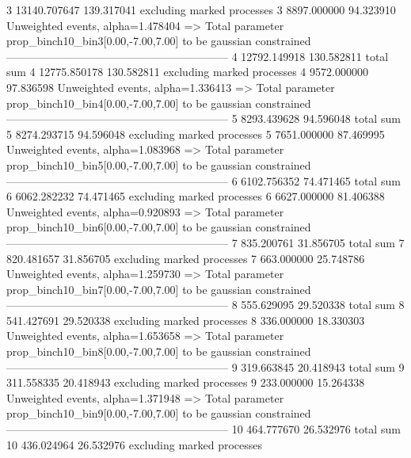 3          13140.707647    139.317041      excluding marked processes    
3          8897.000000     94.323910       Unweighted events, alpha=1.478404
  => Total parameter prop_binch10_bin3[0.00,-7.00,7.00] to be gaussian constrained
------------------------------------------------------------
4          12792.149918    130.582811      total sum                     
4          12775.850178    130.582811      excluding marked processes    
4          9572.000000     97.836598       Unweighted events, alpha=1.336413
  => Total parameter prop_binch10_bin4[0.00,-7.00,7.00] to be gaussian constrained
------------------------------------------------------------
5          8293.439628     94.596048       total sum                     
5          8274.293715     94.596048       excluding marked processes    
5          7651.000000     87.469995       Unweighted events, alpha=1.083968
  => Total parameter prop_binch10_bin5[0.00,-7.00,7.00] to be gaussian constrained
------------------------------------------------------------
6          6102.756352     74.471465       total sum                     
6          6062.282232     74.471465       excluding marked processes    
6          6627.000000     81.406388       Unweighted events, alpha=0.920893
  => Total parameter prop_binch10_bin6[0.00,-7.00,7.00] to be gaussian constrained
------------------------------------------------------------
7          835.200761      31.856705       total sum                     
7          820.481657      31.856705       excluding marked processes    
7          663.000000      25.748786       Unweighted events, alpha=1.259730
  => Total parameter prop_binch10_bin7[0.00,-7.00,7.00] to be gaussian constrained
------------------------------------------------------------
8          555.629095      29.520338       total sum                     
8          541.427691      29.520338       excluding marked processes    
8          336.000000      18.330303       Unweighted events, alpha=1.653658
  => Total parameter prop_binch10_bin8[0.00,-7.00,7.00] to be gaussian constrained
------------------------------------------------------------
9          319.663845      20.418943       total sum                     
9          311.558335      20.418943       excluding marked processes    
9          233.000000      15.264338       Unweighted events, alpha=1.371948
  => Total parameter prop_binch10_bin9[0.00,-7.00,7.00] to be gaussian constrained
------------------------------------------------------------
10         464.777670      26.532976       total sum                     
10         436.024964      26.532976       excluding marked processes    
